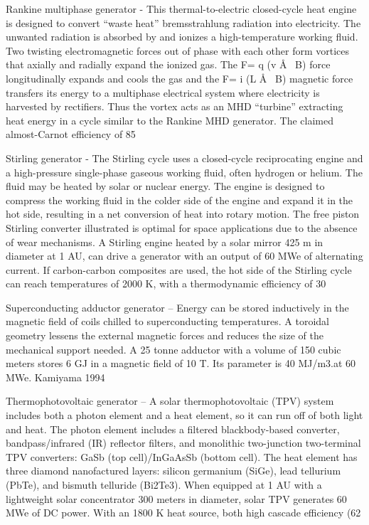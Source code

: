 \documentclass[a4paper]{book}
\begin{document}
Rankine multiphase generator - This thermal-to-electric closed-cycle heat engine is designed to convert “waste heat” bremsstrahlung radiation into electricity. The unwanted radiation is absorbed by and ionizes a high-temperature working fluid. Two twisting electromagnetic forces out of phase with each other form vortices that axially and radially expand the ionized gas. The F= q (v Å~ B) force longitudinally expands and cools the gas and the F= i (L Å~ B) magnetic force transfers its energy to a multiphase electrical system where electricity is harvested by rectifiers. Thus the vortex acts as an MHD “turbine” extracting heat energy in a cycle similar to the Rankine MHD generator. The claimed almost-Carnot efficiency of 85%
 
Stirling generator - The Stirling cycle uses a closed-cycle reciprocating engine and a high-pressure single-phase gaseous working fluid, often hydrogen or helium. The fluid may be heated by solar or nuclear energy. The engine is designed to compress the working fluid in the colder side of the engine and expand it in the hot side, resulting in a net conversion of heat into rotary motion. The free piston Stirling converter illustrated is optimal for space applications due to the absence of wear mechanisms. A Stirling engine heated by a solar mirror 425 m in diameter at 1 AU, can drive a generator with an output of 60 MWe of alternating current. If carbon-carbon composites are used, the hot side of the Stirling cycle can reach temperatures of 2000 K, with a thermodynamic efficiency of 30%
 
Superconducting adductor generator – Energy can be stored inductively in the magnetic field of coils chilled to superconducting temperatures. A toroidal geometry lessens the external magnetic forces and reduces the size of the mechanical support needed. A 25 tonne adductor with a volume of 150 cubic meters stores 6 GJ in a magnetic field of 10 T.  Its parameter is 40 MJ/m3.at 60 MWe.  Kamiyama 1994
 
Thermophotovoltaic generator – A solar thermophotovoltaic (TPV) system includes both a photon element and a heat element, so it can run off of both light and heat.  The photon element includes a filtered blackbody-based converter, bandpass/infrared (IR) reflector filters, and monolithic two-junction two-terminal TPV converters: GaSb (top cell)/InGaAsSb (bottom cell).  The heat element has three diamond nanofactured layers: silicon germanium (SiGe), lead tellurium (PbTe), and bismuth telluride (Bi2Te3). When equipped at 1 AU with a lightweight solar concentrator 300 meters in diameter, solar TPV generates 60 MWe of DC power.  With an 1800 K heat source, both high cascade efficiency (62%
\end{document}
